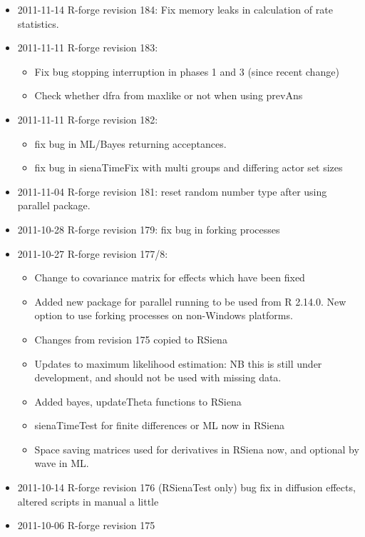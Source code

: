 \documentclass[a4paper,fleqn,11pt]{article}
\newcommand{\+}{\, + \,}
\begin{document}
{\begin{small}
\begin{itemize}
\begin{itemize}
\item Other minor changes to ML with missing values (still incomplete)
\end{itemize}
\item 2011-11-14 R-forge revision 184:
Fix memory leaks in calculation of rate statistics.
\item 2011-11-11 R-forge revision 183:
\begin{itemize}
\item Fix bug stopping interruption in phases 1 and 3 (since recent change)
\item Check whether dfra from maxlike or not when using prevAns
\end{itemize}
\item 2011-11-11 R-forge revision 182:
\begin{itemize}
\item fix bug in ML/Bayes returning
  acceptances.
\item fix bug in sienaTimeFix with multi groups and differing actor set sizes
\end{itemize}
\item 2011-11-04 R-forge revision 181: reset random number type after using
  parallel package.
\item 2011-10-28 R-forge revision 179: fix bug in forking processes
\item 2011-10-27 R-forge revision 177/8:
\begin{itemize}
\item Change to covariance matrix for effects which have been fixed
\item Added new package for parallel running to be used from R 2.14.0. New
  option to use forking processes on non-Windows platforms.
\item Changes from revision 175 copied to RSiena
\item Updates to maximum likelihood estimation: NB this is still under
  development, and should not be used with missing data.
\item Added bayes, updateTheta functions to RSiena
\item sienaTimeTest for finite differences or ML now in RSiena
\item Space saving matrices used for derivatives in RSiena now, and optional by
  wave in ML.
\end{itemize}
\item 2011-10-14 R-forge revision 176 (RSienaTest only)
bug fix in diffusion effects, altered scripts in manual a little
\item 2011-10-06 R-forge revision 175

\end{itemize}
\end{small}}
\end{document}
